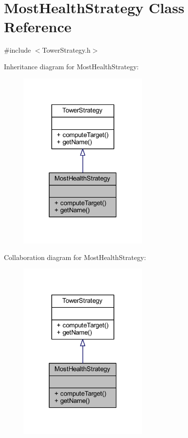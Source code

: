 \hypertarget{class_most_health_strategy}{\section{Most\+Health\+Strategy Class Reference}
\label{class_most_health_strategy}
}


{\ttfamily \#include $<$Tower\+Strategy.\+h$>$}



Inheritance diagram for Most\+Health\+Strategy\+:
\nopagebreak
\begin{figure}[H]
\begin{center}
\leavevmode
\includegraphics[width=183pt]{class_most_health_strategy__inherit__graph}
\end{center}
\end{figure}


Collaboration diagram for Most\+Health\+Strategy\+:
\nopagebreak
\begin{figure}[H]
\begin{center}
\leavevmode
\includegraphics[width=183pt]{class_most_health_strategy__coll__graph}
\end{center}
\end{figure}
